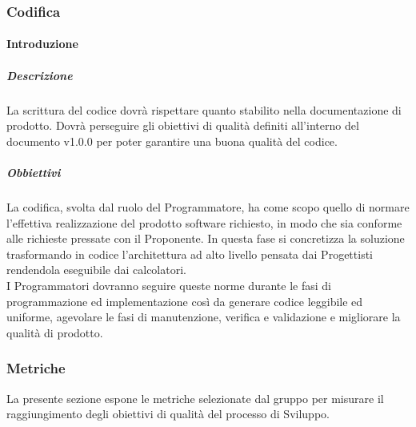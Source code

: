         \subsubsection{Codifica}
            \paragraph{Introduzione}
                \subparagraph{Descrizione}
                    La scrittura del codice dovrà rispettare quanto stabilito nella documentazione di prodotto. Dovrà perseguire gli obiettivi di qualità definiti all'interno del documento  v1.0.0 per poter garantire una buona qualità del codice.\\
                \subparagraph{Obbiettivi}
                    La codifica, svolta dal ruolo del Programmatore, ha come scopo quello di normare l’effettiva realizzazione del prodotto software richiesto, in modo che sia conforme alle richieste pressate con il Proponente. In questa fase si concretizza la soluzione trasformando in codice l’architettura ad alto livello pensata dai Progettisti rendendola eseguibile dai calcolatori.\\
                    I Programmatori dovranno seguire queste norme durante le fasi di programmazione ed implementazione così da generare codice leggibile ed uniforme, agevolare le fasi di manutenzione, verifica e validazione e migliorare la qualità di prodotto.\\    

        \subsubsection{Metriche}
            La presente sezione espone le metriche selezionate dal gruppo per misurare il raggiungimento degli obiettivi di qualità del processo di Sviluppo. \\
